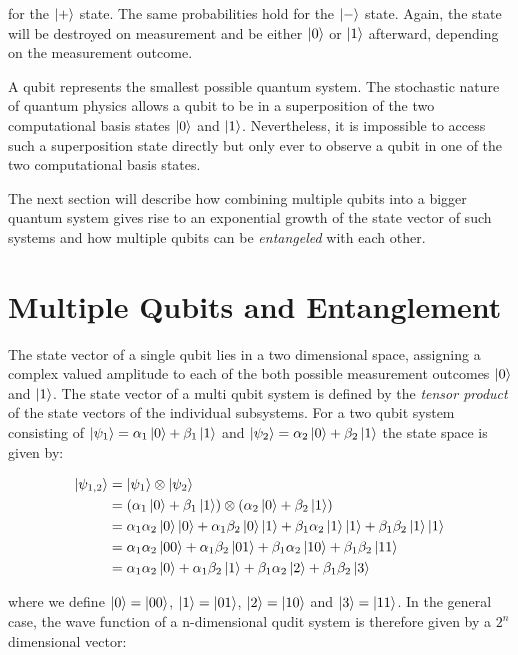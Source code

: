 for the $\Ket{+}$ state. The same probabilities hold for the
$\Ket{-}$ state.
Again, the state will be destroyed on measurement and be either $\Ket{0}$ or $\Ket{1}$ afterward, depending on the measurement outcome.

A qubit represents the smallest possible quantum system. The stochastic nature of quantum physics allows a qubit to be in a superposition of the
two computational basis states $\Ket{0}$ and $\Ket{1}$. 
Nevertheless, it is impossible to access such a superposition state directly
but only ever to observe a qubit in one of the two computational basis states.

The next section will describe how combining multiple qubits into a bigger
quantum system gives rise to an exponential growth of the state vector of such systems and how multiple qubits can be \textit{entangeled}
with each other.

\section{Multiple Qubits and Entanglement}

The state vector of a single qubit lies in a two dimensional 
space, assigning a complex valued amplitude to each of the both possible measurement outcomes
$\Ket{0}$ and $\Ket{1}$. The state vector of a multi qubit system is defined by
the \textit{tensor product} of the state vectors of the individual subsystems.
For a two qubit system consisting of $\Ket{\psi_1} = \alpha_1 \Ket{0} + \beta_1
\Ket{1}$ and $\Ket{\psi_2} = \alpha_2 \Ket{0} + \beta_2 \Ket{1}$ the state space
is given by:

\begin{align}
  \Ket{\psi_{1,2}} &= \Ket{\psi_1} \otimes \Ket{\psi_2} \\
                   &= (\alpha_1 \Ket{0} + \beta_1 \Ket{1}) \otimes (\alpha_2 \Ket{0} + \beta_2 \Ket{1}) \\
                   &= \alpha_1 \alpha_2 \Ket{0}\Ket{0} + \alpha_1 \beta_2 \Ket{0} \Ket{1} + \beta_1 \alpha_2 \Ket{1} \Ket{1} + \beta_1 \beta_2 \Ket{1} \Ket{1} \\
                   &= \alpha_1 \alpha_2 \Ket{00} + \alpha_1 \beta_2 \Ket{01} + \beta_1 \alpha_2 \Ket{10} + \beta_1 \beta_2 \Ket{11} \\
                   &= \alpha_1 \alpha_2 \Ket{0} + \alpha_1 \beta_2 \Ket{1} + \beta_1 \alpha_2 \Ket{2} + \beta_1 \beta_2 \Ket{3}
\end{align}

where we define $\Ket{0} = \Ket{00}$, $\Ket{1} = \Ket{01}$, $\Ket{2} = \Ket{10}$
and $\Ket{3} = \Ket{11}$. In the general case, the wave function of a
n-dimensional qudit system is therefore given by a $2^n$ dimensional vector:

